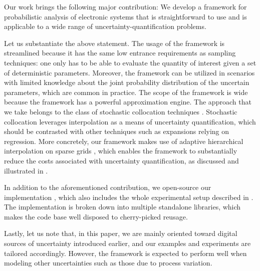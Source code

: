 Our work brings the following major contribution: We develop a framework for
probabilistic analysis of electronic systems that is straightforward to use and
is applicable to a wide range of uncertainty-quantification problems.

Let us substantiate the above statement. The usage of the framework is
streamlined because it has the same low entrance requirements as sampling
techniques: one only has to be able to evaluate the quantity of interest given a
set of deterministic parameters. Moreover, the framework can be utilized in
scenarios with limited knowledge about the joint probability distribution of the
uncertain parameters, which are common in practice. The scope of the framework
is wide because the framework has a powerful approximation engine. The approach
that we take belongs to the class of stochastic collocation techniques
\cite{xiu2010}. Stochastic collocation leverages interpolation as a means of
uncertainty quantification, which should be contrasted with other techniques
such as  expansions relying on regression. More concretely, our framework
makes use of adaptive hierarchical interpolation on sparse grids
\cite{jakeman2012, klimke2006, ma2009}, which enables the framework to
substantially reduce the costs associated with uncertainty quantification, as
discussed and illustrated in .

In addition to the aforementioned contribution, we open-source our
implementation \cite{sources}, which also includes the whole experimental setup
described in . The implementation is broken down into
multiple standalone libraries, which makes the code base well disposed to
cherry-picked reusage.

Lastly, let us note that, in this paper, we are mainly oriented toward digital
sources of uncertainty introduced earlier, and our examples and experiments are
tailored accordingly. However, the framework is expected to perform well when
modeling other uncertainties such as those due to process variation.
